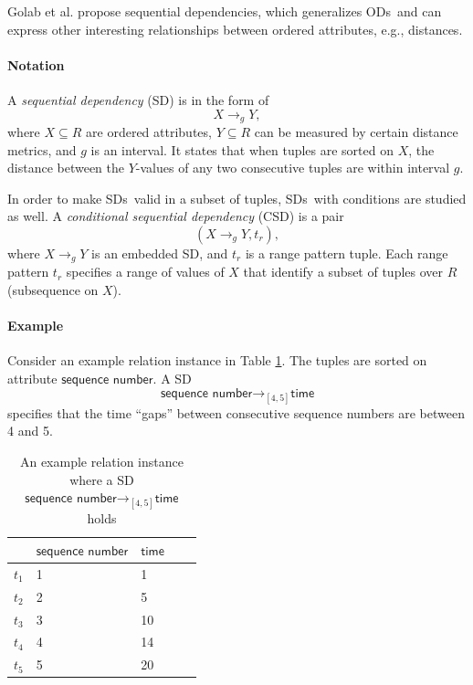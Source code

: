 \documentclass{article}
\begin{document}
Golab et al. \cite{DBLP:journals/pvldb/GolabKKSS09} propose sequential dependencies, which generalizes ODs\ and can express other interesting relationships between ordered attributes, e.g., distances.

\paragraph{Notation}
A \emph{sequential dependency} (SD) is in the form of
$$X\rightarrow_g Y,$$
where $X\subseteq\mathit{R}$ are ordered attributes, $Y\subseteq\mathit{R}$ can be measured by certain distance metrics, and $g$ is an interval.
It states that when tuples are sorted on $X$, the distance between the $Y$-values of any two consecutive tuples are within interval $g$.

In order to make SDs\ valid in a subset of tuples, SDs\ with conditions are studied as well. A \emph{conditional sequential dependency} (CSD) is a pair
$$(X\rightarrow_g Y, t_r),$$
where $X\rightarrow_g Y$ is an embedded SD, and $t_r$ is a range pattern tuple. Each range pattern $t_r$ specifies a range of values of $X$ that identify a subset of tuples over $\mathit{R}$ (subsequence on $X$).

\paragraph{Example}

Consider an example relation instance in Table \ref{table-SD}.
The tuples are sorted on attribute $\textsf{sequence number}$. 
A SD 
$$\textsf{sequence number}\rightarrow_{[4,5]}\textsf{time}$$ 
specifies that the time ``gaps'' between consecutive
sequence numbers are between 4 and 5.

 \begin{table}
 \centering\small
 \caption{An example relation instance where a SD $\textsf{sequence number}\rightarrow_{[4,5]}\textsf{time}$ holds}
 \label{table-SD}
 \begin{tabular}{lllll}
 \toprule  
 & $\textsf{sequence number}$ & $\textsf{time}$ \\
 \midrule
 $t_1$ & 1 & 1\\
 $t_2$ & 2 & 5 \\
 $t_3$ & 3 & 10 \\
 $t_4$ & 4 & 14 \\
 $t_5$ & 5 & 20 \\
 \bottomrule
 \end{tabular}
 \end{table}
\end{document}
